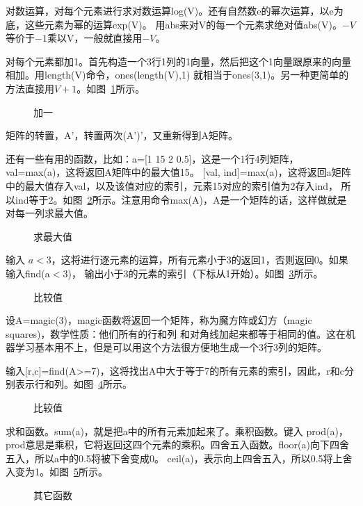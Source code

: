 \documentclass[UTF8]{ctexart}
\begin{document}
对数运算，对每个元素进行求对数运算log(V)。还有自然数e的幂次运算，以e为底，这些元素为幂的运算exp(V)。
用abs来对V的每一个元素求绝对值abs(V)。$-V$等价于$-1$乘以V，一般就直接用$-V$。

对每个元素都加1。首先构造一个3行1列的1向量，然后把这个1向量跟原来的向量相加。用length(V)命令，ones(length(V),1)
就相当于ones(3,1)。另一种更简单的方法直接用$V+1$。如图~\ref{fig:19}所示。
\begin{figure}[H]
 \caption{加一}
 \label{fig:19}
\end{figure}

矩阵的转置，A'，转置两次(A')'，又重新得到A矩阵。

还有一些有用的函数，比如：a=[1 15 2 0.5]，这是一个1行4列矩阵，val=max(a)，这将返回A矩阵中的最大值15。
[val, ind]=max(a)，这将返回a矩阵中的最大值存入val，以及该值对应的索引，元素15对应的索引值为2存入ind，
所以ind等于2。如图~\ref{fig:20}所示。注意用命令max(A)，A是一个矩阵的话，这样做就是对每一列求最大值。
\begin{figure}[H]
 \caption{求最大值}
 \label{fig:20}
\end{figure}

输入 $a<3$，这将进行逐元素的运算，所有元素小于3的返回1，否则返回0。如果输入find(a$<$3)，
输出小于3的元素的索引（下标从1开始）。如图~\ref{fig:21}所示。
\begin{figure}[H]
 \caption{比较值}
 \label{fig:21}
\end{figure}

设A=magic(3)，magic函数将返回一个矩阵，称为魔方阵或幻方（magic squares)，数学性质：他们所有的行和列
和对角线加起来都等于相同的值。这在机器学习基本用不上，但是可以用这个方法很方便地生成一个3行3列的矩阵。

输入[r,c]=find(A>=7)，这将找出A中大于等于7的所有元素的索引，因此，r和c分别表示行和列。如图~\ref{fig:22}所示。
\begin{figure}[H]
 \caption{比较值}
 \label{fig:22}
\end{figure}

求和函数。sum(a)，就是把a中的所有元素加起来了。乘积函数。键入 prod(a)，
prod意思是乘积，它将返回这四个元素的乘积。四舍五入函数。floor(a)向下四舍五入，所以a中的0.5将被下舍变成0。
ceil(a)，表示向上四舍五入，所以0.5将上舍入变为1。如图~\ref{fig:23}所示。
\begin{figure}[H]
 \caption{其它函数}
 \label{fig:23}
\end{figure}
\end{document}
